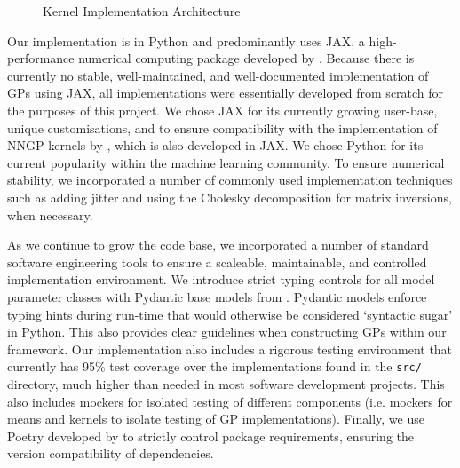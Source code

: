 \documentclass{article}
\def\code#1{\texttt{#1}}
\numberwithin{equation}{section}
\begin{document}
\begin{figure}[h!]
\begin{center}
{
}
\caption{Kernel Implementation Architecture}
\label{kernel-implementation}
\end{center}
\end{figure}

Our implementation is in Python and predominantly uses JAX, a high-performance numerical computing package developed by \cite{jax2018github}.
Because there is currently no stable, well-maintained, and well-documented implementation of GPs using JAX, all implementations were essentially developed from scratch for the purposes of this project.
We chose JAX for its currently growing user-base, unique customisations, and to ensure compatibility with the implementation of NNGP kernels by \cite{novak2019neural}, which is also developed in JAX.
We chose Python for its current popularity within the machine learning community.
To ensure numerical stability, we incorporated a number of commonly used implementation techniques such as adding jitter and using the Cholesky decomposition for matrix inversions, when necessary.

As we continue to grow the code base, we incorporated a number of standard software engineering tools to ensure a scaleable, maintainable, and controlled implementation environment.
We introduce strict typing controls for all model parameter classes with Pydantic base models from \cite{samuel_colvin_2023_8277473}.
Pydantic models enforce typing hints during run-time that would otherwise be considered `syntactic sugar' in Python. This also provides clear guidelines when constructing GPs within our framework.
Our implementation also includes a rigorous testing environment that currently has 95\% test coverage over the implementations found in the \code{src/} directory, much higher than needed in most software development projects.
This also includes mockers for isolated testing of different components (i.e. mockers for means and kernels to isolate testing of GP implementations). Finally, we use Poetry developed by \cite{Eustace} to strictly control package requirements, ensuring the version compatibility of dependencies.
\end{document}
